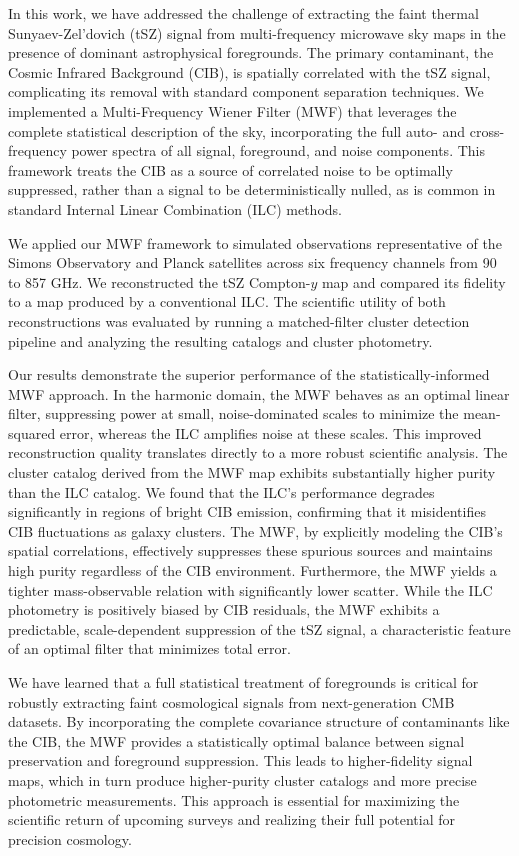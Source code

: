 \documentclass[]{article}
\begin{document}
In this work, we have addressed the challenge of extracting the faint thermal Sunyaev-Zel'dovich (tSZ) signal from multi-frequency microwave sky maps in the presence of dominant astrophysical foregrounds. The primary contaminant, the Cosmic Infrared Background (CIB), is spatially correlated with the tSZ signal, complicating its removal with standard component separation techniques. We implemented a Multi-Frequency Wiener Filter (MWF) that leverages the complete statistical description of the sky, incorporating the full auto- and cross-frequency power spectra of all signal, foreground, and noise components. This framework treats the CIB as a source of correlated noise to be optimally suppressed, rather than a signal to be deterministically nulled, as is common in standard Internal Linear Combination (ILC) methods.

We applied our MWF framework to simulated observations representative of the Simons Observatory and Planck satellites across six frequency channels from 90 to 857 GHz. We reconstructed the tSZ Compton-$y$ map and compared its fidelity to a map produced by a conventional ILC. The scientific utility of both reconstructions was evaluated by running a matched-filter cluster detection pipeline and analyzing the resulting catalogs and cluster photometry.

Our results demonstrate the superior performance of the statistically-informed MWF approach. In the harmonic domain, the MWF behaves as an optimal linear filter, suppressing power at small, noise-dominated scales to minimize the mean-squared error, whereas the ILC amplifies noise at these scales. This improved reconstruction quality translates directly to a more robust scientific analysis. The cluster catalog derived from the MWF map exhibits substantially higher purity than the ILC catalog. We found that the ILC's performance degrades significantly in regions of bright CIB emission, confirming that it misidentifies CIB fluctuations as galaxy clusters. The MWF, by explicitly modeling the CIB's spatial correlations, effectively suppresses these spurious sources and maintains high purity regardless of the CIB environment. Furthermore, the MWF yields a tighter mass-observable relation with significantly lower scatter. While the ILC photometry is positively biased by CIB residuals, the MWF exhibits a predictable, scale-dependent suppression of the tSZ signal, a characteristic feature of an optimal filter that minimizes total error.

We have learned that a full statistical treatment of foregrounds is critical for robustly extracting faint cosmological signals from next-generation CMB datasets. By incorporating the complete covariance structure of contaminants like the CIB, the MWF provides a statistically optimal balance between signal preservation and foreground suppression. This leads to higher-fidelity signal maps, which in turn produce higher-purity cluster catalogs and more precise photometric measurements. This approach is essential for maximizing the scientific return of upcoming surveys and realizing their full potential for precision cosmology.
\end{document}
